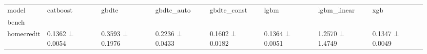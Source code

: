 \begin{tabular}{llllllll}
\toprule
model & catboost & gbdte & gbdte_auto & gbdte_const & lgbm & lgbm_linear & xgb \\
bench &  &  &  &  &  &  &  \\
\midrule
homecredit & 0.1362 ± 0.0054 & 0.3593 ± 0.1976 & 0.2236 ± 0.0433 & 0.1602 ± 0.0182 & 0.1364 ± 0.0051 & 1.2570 ± 1.4749 & 0.1347 ± 0.0049 \\
\bottomrule
\end{tabular}
